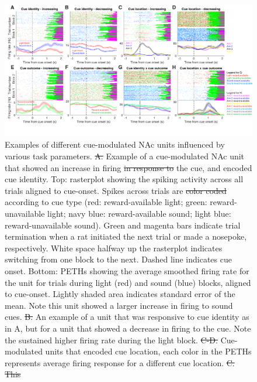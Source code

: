 \documentclass[11pt]{article}
\newcommand{\bsf}[1]{\textbf{#1}}
\providecommand{\DIFadd}[1]{{\protect\color{blue}\uwave{#1}}} %
\providecommand{\DIFdel}[1]{{\protect\color{red}\sout{#1}}}                      %
\providecommand{\DIFaddFL}[1]{\DIFadd{#1}} %
\providecommand{\DIFdelFL}[1]{\DIFdel{#1}} %
\providecommand{\DIFaddbeginFL}{} %
\providecommand{\DIFaddendFL}{} %
\providecommand{\DIFdelbeginFL}{} %
\providecommand{\DIFdelendFL}{} %
\newcommand{\DIFscaledelfig}{0.5}
\newlength{\DIFdelgraphicswidth} %
\newlength{\DIFdelgraphicsheight} %
\newcommand{\DIFaddincludegraphics}[2][]{{\color{blue}\fbox{\DIFOincludegraphics[#1]{#2}}}} %
\newcommand{\DIFdelincludegraphics}[2][]{%
\sbox{\DIFdelgraphicsbox}{\DIFOincludegraphics[#1]{#2}}%
\settoboxwidth{\DIFdelgraphicswidth}{\DIFdelgraphicsbox} %
\settoboxtotalheight{\DIFdelgraphicsheight}{\DIFdelgraphicsbox} %
\scalebox{\DIFscaledelfig}{%
\parbox[b]{\DIFdelgraphicswidth}{\usebox{\DIFdelgraphicsbox}\\[-\baselineskip] \rule{\DIFdelgraphicswidth}{0em}}\llap{\resizebox{\DIFdelgraphicswidth}{\DIFdelgraphicsheight}{%
\setlength{\unitlength}{\DIFdelgraphicswidth}%
\begin{picture}(1,1)%
\thicklines\linethickness{2pt} %
{\color[rgb]{1,0,0}\put(0,0){\framebox(1,1){}}}%
{\color[rgb]{1,0,0}\put(0,0){\line( 1,1){1}}}%
{\color[rgb]{1,0,0}\put(0,1){\line(1,-1){1}}}%
\end{picture}%
}\hspace*{3pt}}} %
} %
\DeclareRobustCommand{\DIFaddbeginFL}{\DIFOaddbeginFL \let\includegraphics\DIFaddincludegraphics} %
\DeclareRobustCommand{\DIFaddendFL}{\DIFOaddendFL \let\includegraphics\DIFOincludegraphics} %
\DeclareRobustCommand{\DIFdelbeginFL}{\DIFOdelbeginFL \let\includegraphics\DIFdelincludegraphics} %
\DeclareRobustCommand{\DIFdelendFL}{\DIFOaddendFL \let\includegraphics\DIFOincludegraphics} %
\begin{document}
{\begin{figure}[h]
\centering
\includegraphics[width=\textwidth]{Fig 5 - Neural examples.png}
\caption{Examples of different cue-modulated NAc units influenced by various
  task parameters. \DIFdelbeginFL \DIFdelFL{A. }\DIFdelendFL \DIFaddbeginFL \DIFaddFL{\bsf{A}: }\DIFaddendFL Example of a cue-modulated NAc unit that showed an
  increase in firing \DIFdelbeginFL \DIFdelFL{in response to }\DIFdelendFL \DIFaddbeginFL \DIFaddFL{following }\DIFaddendFL the cue, and encoded cue identity. Top:
  rasterplot showing the spiking activity across all trials aligned to
  cue-onset. Spikes across trials are \DIFdelbeginFL \DIFdelFL{color coded }\DIFdelendFL \DIFaddbeginFL \DIFaddFL{color-coded }\DIFaddendFL according to cue type (red:
  reward-available light; green: reward-unavailable light; navy blue:
  reward-available sound; light blue: reward-unavailable sound). Green and
  magenta bars indicate trial termination when a rat initiated the next trial or
  made a nosepoke, respectively. White space halfway up the rasterplot indicates
  switching from one block to the next. Dashed line indicates cue onset. Bottom:
  PETHs showing the average smoothed firing rate for the unit for trials during
  light (red) and sound (blue) blocks, aligned to cue-onset. Lightly shaded area
  indicates standard error of the mean. Note this unit showed a larger increase
  in firing to sound cues. \DIFdelbeginFL \DIFdelFL{B. }\DIFdelendFL \DIFaddbeginFL \DIFaddFL{\bsf{B}: }\DIFaddendFL An example of a unit that was responsive to
  cue identity as in A, but for a unit that showed a decrease in firing to the
  cue. Note the sustained higher firing rate during the light block. \DIFdelbeginFL \DIFdelFL{C-D. }\DIFdelendFL \DIFaddbeginFL \DIFaddFL{\bsf{C-D}:
  }\DIFaddendFL Cue-modulated units that encoded cue location, each color in the PETHs
  represents average firing response for a different cue location. \DIFdelbeginFL \DIFdelFL{C. This }\DIFdelendFL \DIFaddbeginFL \DIFaddFL{\bsf{C}: The
}}
\end{figure}}
\end{document}
